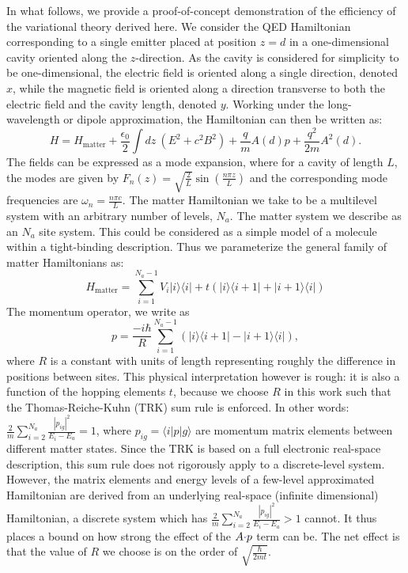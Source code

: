 \documentclass[aps,prl,twocolumn,
	groupedaddress,superscriptaddress,
	amsfonts,amssymb,amsmath,floatfix,
	citeautoscript]{revtex4-1}
\newcommand{\Jadd}[1]{\textcolor{blue}{#1}}
\begin{document}
In what follows, we provide a proof-of-concept demonstration of the efficiency of the variational theory derived here. We consider the QED Hamiltonian corresponding to a single emitter placed at position $z=d$ in a one-dimensional cavity oriented along the $z$-direction. As the cavity is considered for simplicity to be one-dimensional, the electric field is oriented along a single direction, denoted $x$, while the magnetic field is oriented along a direction transverse to both the electric field and the cavity length, denoted $y$. Working under the long-wavelength or dipole approximation, the Hamiltonian can then be written as:
\begin{equation}\label{eq:hamiltonian}
H = H_{\text{matter}}+\frac{\epsilon_0}{2}\int dz~(E^2+c^2B^2)+\frac{q}{m}A(d)p + \frac{q^2}{2m}A^2(d).
\end{equation}
The fields can be expressed as a mode expansion, where for a cavity of length $L$, the modes are given by $F_n(z) = \sqrt{\frac{2}{L}}\sin\left(\frac{n\pi z}{L} \right)$ and the corresponding mode frequencies are $\omega_n = \frac{n\pi c}{L}$. The matter Hamiltonian we take to be a multilevel system with an arbitrary number of levels, $N_a$. The matter system we describe as an $N_a$ site system. This could be considered as a simple model of a molecule within a tight-binding description. Thus we parameterize the general family of matter Hamiltonians as:
\begin{equation}\label{eq:matter_hamiltonian}
H_{\text{matter}} = \sum\limits_{i=1}^{{N_a-1}} V_i|i\rangle\langle i|+t(|i\rangle\langle i+1|+|i+1\rangle\langle i|) 
\end{equation}
The momentum operator, we write as 
\begin{equation}\label{eq:momentum_operator}
p = \frac{-i\hbar}{R}\sum\limits_{i=1}^{N_a-1} \left(|i\rangle\langle i+1|-|i+1\rangle\langle i| \right),
\end{equation}
where $R$ is a constant with units of length representing roughly the difference in positions between sites. This physical interpretation however is rough: it is also a function of the hopping elements $t$, because we choose $R$ in this work such that the Thomas-Reiche-Kuhn (TRK) sum rule is enforced. In other words: $\frac{2}{m}\sum\limits_{i=2}^{N_a}\frac{|p_{ig}|^2}{E_i - E_a} = 1$, where $p_{ig} = \langle i|p|g\rangle$ are momentum matrix elements between different matter states.  Since the TRK is based on a full electronic real-space description, this sum rule does not rigorously apply to a discrete-level system. However, the matrix elements and energy levels of a few-level approximated Hamiltonian  are derived from an underlying real-space (infinite dimensional) Hamiltonian, a discrete system which has  $\frac{2}{m}\sum\limits_{i=2}^{N_a}\frac{|p_{ig}|^2}{E_i - E_a} > 1$ cannot. It thus places a bound on how strong the effect of the $A\Jadd{\cdot}p$ term can be. The net effect is that the value of $R$ we choose is on the order of $\sqrt{\frac{\hbar}{2mt}}$.
\end{document}
